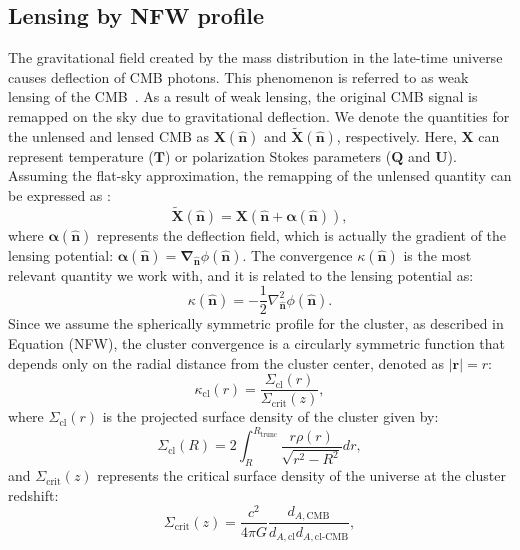 \documentclass[prd, superscriptaddress, tightenlines, longbibliography, nofootinbib, eqsecnum, amsfonts, amsmath, floatfix, twocolumn, notitlepage]{revtex4-2}
\newcommand{\JC}[1]{\color{purple}{{JC:#1}}\color{black}\xspace}
\begin{document}
\subsection{Lensing by NFW profile}
The gravitational field created by the mass distribution in the late-time universe causes deflection of CMB photons. This phenomenon is referred to as weak lensing of the CMB~\cite{Lewis:2006fu}. As a result of weak lensing, the original CMB signal is remapped on the sky due to gravitational deflection. We denote the quantities for the unlensed and lensed CMB as $\mathbf{X} (\hat{\mathbf{n}})$ and $\widetilde{\mathbf{X}} (\hat{\mathbf{n}})$, respectively. Here, $\mathbf{X}$ can represent temperature ($\mathbf{T}$) or polarization Stokes parameters ($\mathbf{Q}$ and $\mathbf{U}$). Assuming the flat-sky approximation, the remapping of the unlensed quantity can be expressed as \JC{bold vs unbold $\hat n$ to fix}:
\begin{equation}
\widetilde{\mathbf{X}} (\hat{\mathbf{n}}) = \mathbf{X} (\hat{\mathbf{n}} + \boldsymbol{\alpha}(\hat{\mathbf{n}})),
\end{equation}
where $\boldsymbol{\alpha} (\hat{\mathbf{n}})$ represents the deflection field, which is actually the gradient of the lensing potential: $\boldsymbol{\alpha} (\hat{\mathbf{n}}) = \boldsymbol{\nabla}_{\hat{\mathbf{n}}}\phi(\hat{\mathbf{n}})$. The convergence $\kappa (\hat{\mathbf{n}})$ is the most relevant quantity we work with, and it is related to the lensing potential as:
\begin{equation}
\kappa(\hat{\mathbf{n}}) = -\frac{1}{2}\nabla^2_{\hat{\mathbf{n}}}\phi(\hat{\mathbf{n}}).
\end{equation}
Since we assume the spherically symmetric profile for the cluster, as described in Equation (NFW), the cluster convergence is a circularly symmetric function that depends only on the radial distance from the cluster center, denoted as $|\mathbf{r}| = r$:
\begin{equation}
\kappa_{\text{cl}}(r) = \frac{\Sigma_{\text{cl}}(r)}{\Sigma_{\text{crit}}(z)},
\end{equation}
where $\Sigma_{\text{cl}}(r)$ is the projected surface density of the cluster given by:
\begin{equation}
\Sigma_{\text{cl}}(R) = 2 \int_{R}^{R_{\text{trunc}}}\frac{r\rho(r)}{\sqrt{r^2-R^2}} dr,
\end{equation}
and $\Sigma_{\text{crit}}(z)$ represents the critical surface density of the universe at the cluster redshift:
\begin{equation}
\Sigma_{\text{crit}}(z) = \frac{c^2}{4\pi G}\frac{d_{A,\text{CMB}}}{d_{A,\text{cl}}d_{A,\text{cl-CMB}}},
\end{equation}
\end{document}
